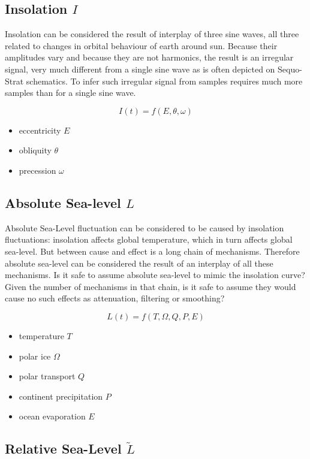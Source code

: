 \documentclass[12pt]{article}
\begin{document}
\subsection*{Insolation $I$}

Insolation can be considered the result of interplay of three sine waves, all three related to changes in orbital behaviour of earth around sun. Because their amplitudes vary and because they are not harmonics, the result is an irregular signal, very much different from a single sine wave as is often depicted on Sequo-Strat schematics. To infer such irregular signal from samples requires much more samples than for a single sine wave.

$$
I(t) = f(E,\theta,\omega)
$$

\begin{itemize}
  \item eccentricity $E$
  \item obliquity $\theta$
  \item precession $\omega$
\end{itemize}

\subsection*{Absolute Sea-level $L$}

Absolute Sea-Level fluctuation can be considered to be caused by insolation fluctuations: insolation affects global temperature, which in turn affects global sea-level. But between cause and effect is a long chain of mechanisms. Therefore absolute sea-level can be considered the result of an interplay of all these mechanisms. Is it safe to assume absolute sea-level to mimic the insolation curve? Given the number of mechanisms in that chain, is it safe to assume they would cause no such effects as attenuation, filtering or smoothing?

$$
L(t) = f(T,\Omega,Q,P,E)
$$

\begin{itemize}
  \item temperature $T$
  \item polar ice $\Omega$
  \item polar transport $Q$
  \item continent precipitation $P$
  \item ocean evaporation $E$
\end{itemize}

\subsection*{Relative Sea-Level $\tilde{L}$}
\end{document}
